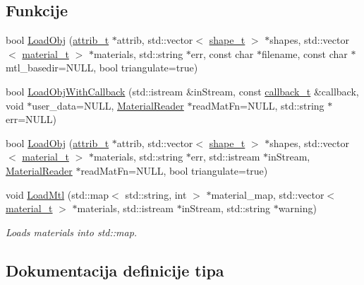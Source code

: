 \subsection*{Funkcije}
\begin{DoxyCompactItemize}
\item 
bool \hyperlink{namespacetinyobj_a5678f6df6cb6d01bb89453022d997503}{Load\+Obj} (\hyperlink{structtinyobj_1_1attrib__t}{attrib\+\_\+t} $\ast$attrib, std\+::vector$<$ \hyperlink{structtinyobj_1_1shape__t}{shape\+\_\+t} $>$ $\ast$shapes, std\+::vector$<$ \hyperlink{structtinyobj_1_1material__t}{material\+\_\+t} $>$ $\ast$materials, std\+::string $\ast$err, const char $\ast$filename, const char $\ast$mtl\+\_\+basedir=N\+U\+LL, bool triangulate=true)
\item 
bool \hyperlink{namespacetinyobj_add9ad979e8011ccdfac2e1ec8def5359}{Load\+Obj\+With\+Callback} (std\+::istream \&in\+Stream, const \hyperlink{namespacetinyobj_a7d9ae2b4716367a1b66b4d354482b035}{callback\+\_\+t} \&callback, void $\ast$user\+\_\+data=N\+U\+LL, \hyperlink{classtinyobj_1_1MaterialReader}{Material\+Reader} $\ast$read\+Mat\+Fn=N\+U\+LL, std\+::string $\ast$err=N\+U\+LL)
\item 
bool \hyperlink{namespacetinyobj_ad1e942879313375fcd1b08b7d6e7f89d}{Load\+Obj} (\hyperlink{structtinyobj_1_1attrib__t}{attrib\+\_\+t} $\ast$attrib, std\+::vector$<$ \hyperlink{structtinyobj_1_1shape__t}{shape\+\_\+t} $>$ $\ast$shapes, std\+::vector$<$ \hyperlink{structtinyobj_1_1material__t}{material\+\_\+t} $>$ $\ast$materials, std\+::string $\ast$err, std\+::istream $\ast$in\+Stream, \hyperlink{classtinyobj_1_1MaterialReader}{Material\+Reader} $\ast$read\+Mat\+Fn=N\+U\+LL, bool triangulate=true)
\item 
void \hyperlink{namespacetinyobj_aa7a035d152857396e5cde8ebff8b2b9e}{Load\+Mtl} (std\+::map$<$ std\+::string, int $>$ $\ast$material\+\_\+map, std\+::vector$<$ \hyperlink{structtinyobj_1_1material__t}{material\+\_\+t} $>$ $\ast$materials, std\+::istream $\ast$in\+Stream, std\+::string $\ast$warning)
\begin{DoxyCompactList}\small\item\em Loads materials into std\+::map. \end{DoxyCompactList}\end{DoxyCompactItemize}


\subsection{Dokumentacija definicije tipa}
\mbox{\label{namespacetinyobj_a7d9ae2b4716367a1b66b4d354482b035}} 

